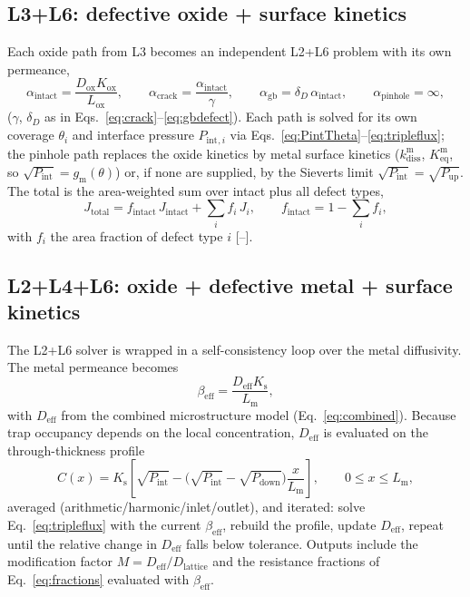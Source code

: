 \documentclass[11pt,a4paper]{article}
\newcommand{\Pup}{P_{\mathrm{up}}}
\newcommand{\Pdown}{P_{\mathrm{down}}}
\newcommand{\Pint}{P_{\mathrm{int}}}
\newcommand{\Ks}{K_{\mathrm{s}}}
\newcommand{\Kox}{K_{\mathrm{ox}}}
\newcommand{\Keq}{K_{\mathrm{eq}}}
\newcommand{\Dox}{D_{\mathrm{ox}}}
\newcommand{\Deff}{D_{\mathrm{eff}}}
\newcommand{\Lm}{L_{\mathrm{m}}}
\newcommand{\Lox}{L_{\mathrm{ox}}}
\newcommand{\kdiss}{k_{\mathrm{diss}}}
\begin{document}
\subsection{L3+L6: defective oxide + surface kinetics}

Each oxide path from L3 becomes an independent L2+L6 problem with its own
permeance,
\begin{equation}
  \alpha_{\mathrm{intact}} = \frac{\Dox\Kox}{\Lox}, \qquad
  \alpha_{\mathrm{crack}} = \frac{\alpha_{\mathrm{intact}}}{\gamma}, \qquad
  \alpha_{\mathrm{gb}} = \delta_D\,\alpha_{\mathrm{intact}}, \qquad
  \alpha_{\mathrm{pinhole}} = \infty,
  \label{eq:alphapaths}
\end{equation}
($\gamma$, $\delta_D$ as in Eqs.~\eqref{eq:crack}--\eqref{eq:gbdefect}). Each
path is solved for its own coverage $\theta_i$ and interface pressure
$\Pint{}_{,i}$ via Eqs.~\eqref{eq:PintTheta}--\eqref{eq:tripleflux}; the
pinhole path replaces the oxide kinetics by metal surface kinetics
($\kdiss^{\mathrm{m}}$, $\Keq^{\mathrm{m}}$, so $\sqrt{\Pint} = g_{\mathrm{m}}(\theta)$)
or, if none are supplied, by the Sieverts limit $\sqrt{\Pint} = \sqrt{\Pup}$.
The total is the area-weighted sum over intact plus all defect types,
\begin{equation}
  J_{\mathrm{total}} = f_{\mathrm{intact}}\,J_{\mathrm{intact}}
                     + \sum_i f_i\, J_i,
  \qquad f_{\mathrm{intact}} = 1 - \sum_i f_i,
  \label{eq:L3L6total}
\end{equation}
with $f_i$ the area fraction of defect type $i$ [--].

\subsection{L2+L4+L6: oxide + defective metal + surface kinetics}

The L2+L6 solver is wrapped in a self-consistency loop over the metal
diffusivity. The metal permeance becomes
\begin{equation}
  \beta_{\mathrm{eff}} = \frac{\Deff \Ks}{\Lm},
  \label{eq:betaeff}
\end{equation}
with $\Deff$ from the combined microstructure model
(Eq.~\eqref{eq:combined}). Because trap occupancy depends on the local
concentration, $\Deff$ is evaluated on the through-thickness profile
\begin{equation}
  C(x) = \Ks\left[\sqrt{\Pint} - \bigl(\sqrt{\Pint} - \sqrt{\Pdown}\bigr)\frac{x}{\Lm}\right],
  \qquad 0 \le x \le \Lm,
  \label{eq:profile}
\end{equation}
averaged (arithmetic/harmonic/inlet/outlet), and iterated: solve
Eq.~\eqref{eq:tripleflux} with the current $\beta_{\mathrm{eff}}$, rebuild the
profile, update $\Deff$, repeat until the relative change in $\Deff$ falls
below tolerance. Outputs include the modification factor
$M = \Deff/D_{\mathrm{lattice}}$ and the resistance fractions of
Eq.~\eqref{eq:fractions} evaluated with $\beta_{\mathrm{eff}}$.
\end{document}
